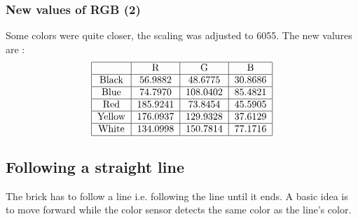 \documentclass[a4paper, 12pt]{article}
\begin{document}
\subsubsection{New values of RGB (2)}
Some colors were quite closer, the scaling was adjusted to 6055. The new valures are :
\begin{align}
\begin{tabular}{|c|c|c|c|}
\hline 
 & R & G & B \\ 
\hline 
\text{Black} & 56.9882 & 48.6775 & 30.8686 \\ 
\hline 
\text{Blue} & 74.7970 & 108.0402 & 85.4821 \\ 
\hline 
\text{Red} & 185.9241 & 73.8454 & 45.5905 \\ 
\hline 
\text{Yellow} & 176.0937 & 129.9328 & 37.6129 \\ 
\hline 
\text{White} & 134.0998 & 150.7814 & 77.1716 \\ 
\hline 
\end{tabular}
\end{align}

\subsection{Following a straight line}

The brick has to follow a line i.e. following the line until it ends. A basic idea is to move forward while the color sensor detects the same color as the line's color.
\\ \\
\end{document}
